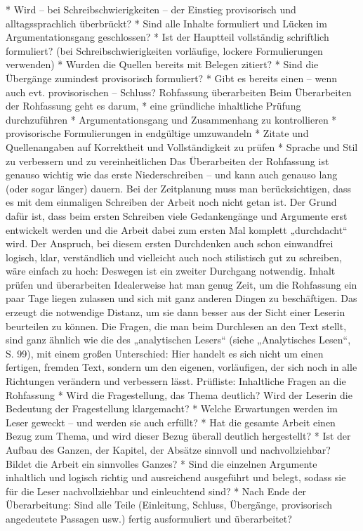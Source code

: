 \documentclass[]{book}
\theoremstyle{definition}
\theoremstyle{definition}
\theoremstyle{definition}
\theoremstyle{remark}
\begin{document}
* Wird -- bei Schreibschwierigkeiten -- der Einstieg provisorisch und
alltagssprachlich überbrückt? * Sind alle Inhalte formuliert und Lücken
im Argumentationsgang geschlossen? * Ist der Hauptteil vollständig
schriftlich formuliert? (bei Schreibschwierigkeiten vorläufige, lockere
Formulierungen verwenden) * Wurden die Quellen bereits mit Belegen
zitiert? * Sind die Übergänge zumindest provisorisch formuliert? * Gibt
es bereits einen -- wenn auch evt. provisorischen -- Schluss? Rohfassung
überarbeiten Beim Überarbeiten der Rohfassung geht es darum, * eine
gründliche inhaltliche Prüfung durchzuführen * Argumentationsgang und
Zusammenhang zu kontrollieren * provisorische Formulierungen in
endgültige umzuwandeln * Zitate und Quellenangaben auf Korrektheit und
Vollständigkeit zu prüfen * Sprache und Stil zu verbessern und zu
vereinheitlichen Das Überarbeiten der Rohfassung ist genauso wichtig wie
das erste Niederschreiben -- und kann auch genauso lang (oder sogar
länger) dauern. Bei der Zeitplanung muss man berücksichtigen, dass es
mit dem einmaligen Schreiben der Arbeit noch nicht getan ist. Der Grund
dafür ist, dass beim ersten Schreiben viele Gedankengänge und Argumente
erst entwickelt werden und die Arbeit dabei zum ersten Mal komplett
„durchdacht`` wird. Der Anspruch, bei diesem ersten Durchdenken auch
schon einwandfrei logisch, klar, verständlich und vielleicht auch noch
stilistisch gut zu schreiben, wäre einfach zu hoch: Deswegen ist ein
zweiter Durchgang notwendig. Inhalt prüfen und überarbeiten Idealerweise
hat man genug Zeit, um die Rohfassung ein paar Tage liegen zulassen und
sich mit ganz anderen Dingen zu beschäftigen. Das erzeugt die notwendige
Distanz, um sie dann besser aus der Sicht einer Leserin beurteilen zu
können. Die Fragen, die man beim Durchlesen an den Text stellt, sind
ganz ähnlich wie die des „analytischen Lesers`` (siehe „Analytisches
Lesen``, S. 99), mit einem großen Unterschied: Hier handelt es sich
nicht um einen fertigen, fremden Text, sondern um den eigenen,
vorläufigen, der sich noch in alle Richtungen verändern und verbessern
lässt. Prüfliste: Inhaltliche Fragen an die Rohfassung * Wird die
Fragestellung, das Thema deutlich? Wird der Leserin die Bedeutung der
Fragestellung klargemacht? * Welche Erwartungen werden im Leser geweckt
-- und werden sie auch erfüllt? * Hat die gesamte Arbeit einen Bezug zum
Thema, und wird dieser Bezug überall deutlich hergestellt? * Ist der
Aufbau des Ganzen, der Kapitel, der Absätze sinnvoll und
nachvollziehbar? Bildet die Arbeit ein sinnvolles Ganzes? * Sind die
einzelnen Argumente inhaltlich und logisch richtig und ausreichend
ausgeführt und belegt, sodass sie für die Leser nachvollziehbar und
einleuchtend sind? * Nach Ende der Überarbeitung: Sind alle Teile
(Einleitung, Schluss, Übergänge, provisorisch angedeutete Passagen usw.)
fertig ausformuliert und überarbeitet?
\end{document}
